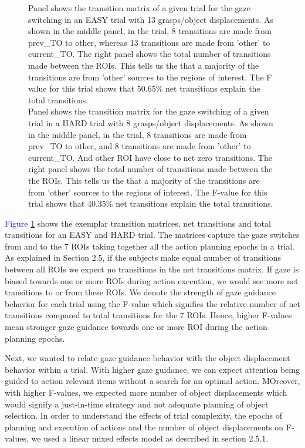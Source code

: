 \begin{figure}[h]
{    Panel \protect{} shows the transition matrix of a given trial for the gaze switching in an EASY trial with 13 grasps/object displacements. As shown in the middle panel, in the trial, 8 transitions are made from prev\_TO to other, whereas 13 transitions are made from 'other' to current\_TO. The right panel shows the total number of transitions made between the ROIs. This tells us the that a majority of the transitions are from 'other' sources to the regions of interest. The F value for this trial shows that 50.65\%  net transitions explain the total transitions.\\
    Panel \protect{} shows the transition matrix for the gaze switching of a given trial in a HARD trial with 8 grasps/object displacements. As shown in the middle panel, in the trial, 8 transitions are made from prev\_TO to other, and 8 transitions are made from 'other' to current\_TO. And other ROI have close to net zero transitions. The right panel shows the total number of transitions made between the the ROIs. This tells us the that a majority of the transitions are from 'other' sources to the regions of interest. The F-value for this trial shows that 40.35\%  net transitions explain the total transitions.}
    \label{figure:transition_matrices_plan}
\end{figure}

\textcolor{Blue}{Figure \ref{figure:transition_matrices_plan}} shows the exemplar transition matrices, net transitions and total transitions for an  EASY and HARD trial. The matrices capture the gaze switches from and to the 7 ROIs taking together all the action planning epochs in a trial. As explained in Section 2.5, if the subjects make equal number of transitions between all ROIs we expect no transitions in the net transitions matrix. If gaze is biased towards one or more ROIs during action execution, we would see more net transitions to or from these ROIs. We denote the strength of gaze guidance behavior for each trial using the F-value which signifies the relative number of net transitions compared to total transitions for the 7 ROIs. Hence, higher F-values mean stronger gaze guidance towards one or more ROI during the action planning epochs.

Next, we wanted to relate gaze guidance behavior with the object displacement behavior within a trial. With higher gaze guidance, we can expect attention being guided to action relevant items without a search for an optimal action. MOreover, with higher F-values, we expected more number of object displacements which would signify a just-in-time strategy and not adequate planning of object selection. In order to understand the effects of trial complexity, the epochs of planning and execution of actions and the number of object displacements on F-values, we used a linear mixed effects model as described in section 2.5.1.  

